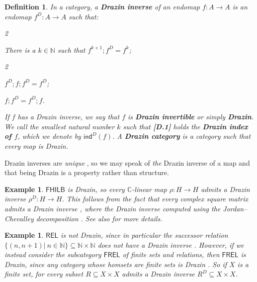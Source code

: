 \documentclass[submission,copyright,creativecommons]{eptcs}
\newtheorem{definition}[observation]{Definition}
\newtheorem{example}[observation]{Example}
\begin{document}
\begin{definition}  \label{def:Drazin}  In a category, a \textbf{Drazin inverse} \cite[Def 2.2]{cockett2024drazin} of an endomap $f: A \to A$ is an endomap $f^D: A \to A$ such that:  
\begin{enumerate}[{\bf [$\text{D}$.1]}]
\begin{multicols}{2}
\item There is a $k \in \mathbb{N}$ such that $f^{k+1} ;f^D = f^k$;
\columnbreak
\begin{multicols}{2} 
\item $f^D ;f ;f^D = f^D$; 
\columnbreak
\item $f ;f^D = f^D ;f$. 
\end{multicols}
\end{multicols}
\end{enumerate}
\vspace{-0.3cm}
If $f$ has a Drazin inverse, we say that $f$ is \textbf{Drazin invertible} or simply \textbf{Drazin}. We call the smallest natural number $k$ such that \textbf{[D.1]} holds the \textbf{Drazin index of $f$}, which we denote by $\mathsf{ind}^D(f)$. A \textbf{Drazin category} is a category such that every map is Drazin. 
\end{definition}

Drazin inverses are \emph{unique} \cite[Prop 2.3]{cockett2024drazin}, so we may speak of \emph{the} Drazin inverse of a map and that being Drazin is a property rather than structure. 

\begin{example} $\mathsf{FHILB}$ is Drazin, so every $\mathbb{C}$-linear map $\rho: H \to H$ admits a Drazin inverse $\rho^D: H \to H$. This follows from the fact that every complex square matrix admits a Drazin inverse \cite[Chap 7]{campbell2009generalized}, where the Drazin inverse computed using the Jordan–Chevalley decomposition \cite[Thm 7.2.1]{campbell2009generalized}. See also \cite[Sec 2.8]{cockett2024drazin} for more details. 
\end{example}

\begin{example} $\mathsf{REL}$ is not Drazin, since in particular the successor relation $\lbrace (n, n+1) \vert~ n \in \mathbb{\mathbb{N}} \rbrace \subseteq \mathbb{N} \times \mathbb{N}$ does not have a Drazin inverse \cite[Sec 2.10]{cockett2024drazin}. However, if we instead consider the subcategory $\mathsf{FREL}$ of \textit{finite sets} and relations, then $\mathsf{FREL}$ is Drazin, since any category whose homsets are finite sets is Drazin \cite[Lem 2.11]{cockett2024drazin}. So if $X$ is a finite set, for every subset $R \subseteq X \times X$ admits a Drazin inverse $R^D \subseteq X \times X$. 
\end{example}
\end{document}
